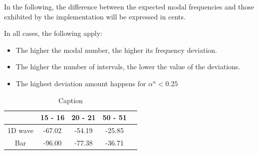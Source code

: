 \documentclass[fleqn]{jaes}
\begin{document}

In the following, the difference between the expected modal frequencies and those exhibited by the implementation will be expressed in cents.

In all cases, the following apply:
\begin{itemize}
    \item The higher the modal number, the higher its frequency deviation.
    \item The higher the number of intervals, the lower the value of the deviations.
    \item The highest deviation amount happens for $\alpha^n < 0.25$
\end{itemize}




\begin{table}[h]
    \centering
        \caption{Caption}

    \begin{tabular}{|c|c|c|c|c|}
        \hline & 15 - 16 & 20 - 21 & 50 - 51  \\\hline
        1D wave & -67.02 & -54.19 & -25.85 \\
        Bar & -96.00 & -77.38 & -36.71\\\hline
    \end{tabular}
    \label{tab:my_label}
\end{table}
\end{document}
